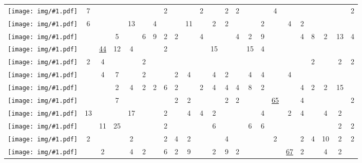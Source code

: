 \documentclass{aes130}
\newcommand{\sixthpic}[1][]{\texttt{[image: img/\#1.pdf]}}
\begin{document}
\begin{table*}
\begin{center}
\begin{tabular}{|c|c|c|c|c|c|c|c|c|c|c|c|c|c|c|c|c|c|c|c|c|c|c|}
\sixthpic[right-up]
 &  7 &    &    &    &    &    &  2 &    &    &  2 &    &  2 &  2 &    &    &  4 &    &    &    &    &    &  2 \\ \cline{2-23}

\sixthpic[right-down]
 &  6 &    &    & 13 &    &  4 &    &    & 11 &    &  2 &  2 &    &    &  2 &    &  4 &  2 &    &    &    &    \\ \cline{2-23}

\sixthpic[right-left]
 &    &    &  5 &    &  6 &  9 &  2 &  2 &    &  4 &    &    &  4 &  2 &  9 &    &    &  4 &  8 &  2 & 13 &  4 \\ \cline{2-23}

\sixthpic[left]
 &    & \underline{44} & 12 &  4 &    &    &  2 &    &    &    & 15 &    &    & 15 &  4 &    &    &    &    &    &    &    \\ \cline{2-23}

\sixthpic[left-up]
 &  2 &  4 &    &    &  2 &    &    &    &    &    &    &    &    &    &    &    &    &    &  2 &    &  2 &  2 \\ \cline{2-23}

\sixthpic[left-down]
 &    &  4 &  7 &    &  2 &    &    &  2 &  4 &    &  4 &  2 &    &  4 &  4 &    &  4 &    &    &    &    &    \\ \cline{2-23}

\sixthpic[left-right]
 &    &    &  2 &  4 &  2 &  2 &  6 &  2 &    &  2 &  4 &  4 &  4 &  8 &  2 &    &    &  4 &  2 &  2 & 15 &    \\ \cline{2-23}

\sixthpic[up]
 &    &    &  7 &    &    &    &    &  2 &  2 &    &    &  2 &  2 &    &    & \underline{65} &    &  4 &    &    &    &  2 \\ \cline{2-23}

\sixthpic[up-left]
 & 13 &    &    & 17 &    &    &  2 &    &  4 &  4 &  2 &    &    &    &  4 &    &  2 &  4 &    &  4 &  2 &    \\ \cline{2-23}

\sixthpic[up-right]
 &    & 11 & 25 &    &    &    &  2 &    &    &    &  6 &    &    &  6 &  6 &    &    &    &    &    &  2 &  2 \\ \cline{2-23}

\sixthpic[up-down]
 &  2 &    &    &  2 &    &    &  2 &  4 &  2 &    &    &  4 &    &    &    &  2 &    &  2 &  4 & 10 &  2 &  2 \\ \cline{2-23}

\sixthpic[down]
 &    &  2 &    &  4 &  2 &    &  6 &  2 &  9 &    &  2 &  9 &  2 &    &    &    &\underline{67} &  2 &    &  4 &  2 &    \\ \cline{2-23}


\end{tabular}
\end{center}
\end{table*}
\end{document}
